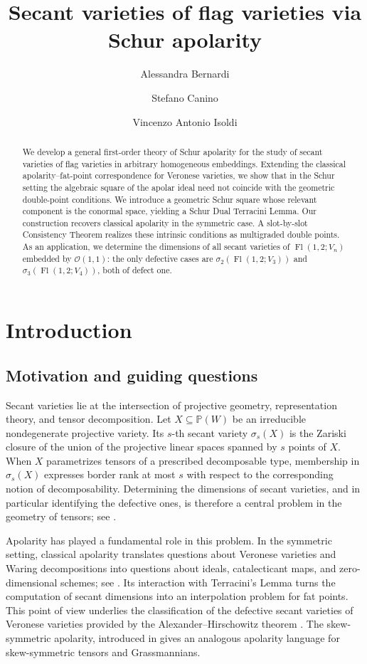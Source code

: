 \documentclass[a4paper,reqno]{amsart}
\title{Secant varieties of flag varieties via Schur apolarity}
\author{Alessandra Bernardi}
\author{Stefano Canino}
\author{Vincenzo Antonio Isoldi}
\theoremstyle{plainnopunct}
\theoremstyle{definitionnopunct}
\renewcommand{\P}{\mathbb{P}}
\newcommand{\cO}{\mathcal{O}}
\DeclareMathOperator{\Fl}{Fl}
\begin{document}
\begin{abstract}
We develop a general first-order theory of Schur apolarity for the
study of secant varieties of flag varieties in arbitrary homogeneous
embeddings. Extending the classical apolarity--fat-point
correspondence for Veronese varieties, we show that in the Schur
setting the algebraic square of the apolar ideal need not coincide
with the geometric double-point conditions. We introduce a geometric
Schur square whose
relevant component is the conormal space, yielding a Schur Dual
Terracini Lemma. Our construction recovers classical apolarity in the
symmetric case. A slot-by-slot Consistency Theorem realizes these
intrinsic conditions as multigraded double points. As an application, we determine the dimensions of all secant varieties of $\Fl(1,2;V_n)$ embedded by
$\cO(1,1)$: the only defective cases are
$\sigma_2(\Fl(1,2;V_3))$ and $\sigma_3(\Fl(1,2;V_4))$, both of defect
one.
\end{abstract}

\maketitle

\section{Introduction}

\subsection{Motivation and guiding questions}

Secant varieties lie at the intersection of projective geometry,
representation theory, and tensor decomposition. Let
$X\subseteq\P(W)$
be an irreducible nondegenerate projective variety. Its $s$-th secant
variety $\sigma_s(X)$ is the Zariski closure of the union of the
projective linear spaces spanned by $s$ points of $X$. When $X$
parametrizes tensors of a prescribed decomposable type, membership in
$\sigma_s(X)$ expresses border rank at most $s$ with respect to the
corresponding notion of decomposability. Determining the dimensions
of secant varieties, and in particular identifying the defective
ones, is therefore a central problem in the geometry of tensors; see
\cite{bernardi_hitchhiker_2018}.

Apolarity has played a fundamental role in this problem. In the
symmetric setting, classical apolarity translates questions about
Veronese varieties and Waring decompositions into questions about
ideals, catalecticant maps, and zero-dimensional schemes; see
\cite{IarrobinoKanev1999,bernardi_hitchhiker_2018}. Its interaction
with Terracini's Lemma turns the computation of secant dimensions into
an interpolation problem for fat points. This point of view underlies
the classification of the defective secant varieties of Veronese
varieties provided by the Alexander--Hirschowitz theorem
\cite{AlexanderHirschowitz1995,BrambillaOttaviani2008}. The
skew-symmetric apolarity, introduced in
\cite{ArrondoBernardiMarquesMourrain2021} gives an analogous
apolarity language for skew-symmetric tensors and Grassmannians.
\end{document}
